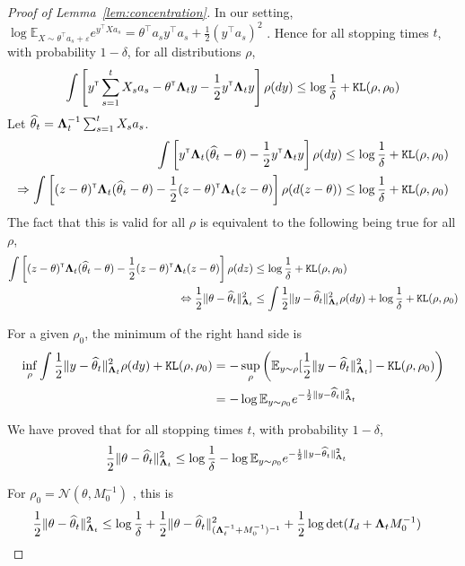 \begin{proof}[Proof of Lemma~\ref{lem:concentration}]
In our setting, $\log \mathbb{E}_{X\sim \theta^\top a_s+\varepsilon}e^{y^\top X a_s} = \theta^\top a_s y^\top a_s+\frac{1}{2} (y^\top a_s)^2$ . Hence for all stopping times $t$, with probability $1- \delta$, for all distributions $\rho$,
\begin{align*}
\int \left[y^{\mathsf{\scriptscriptstyle T}} \sum_{s=1}^t X_s a_s - \theta^{\mathsf{\scriptscriptstyle T}} {\boldsymbol \Lambda}_t y -\frac{1}{2} y^{\mathsf{\scriptscriptstyle T}} {\boldsymbol \Lambda}_t y \right] \rho(dy)
\le \log\frac{1}{\delta} + \texttt{KL}(\rho,\rho_0)
\end{align*}
Let $\widehat{\theta}_t = {\boldsymbol \Lambda}_t^{-1}\sum_{s=1}^t X_s a_s$.
\begin{align*}
\int \left[y^{\mathsf{\scriptscriptstyle T}} {\boldsymbol \Lambda}_t (\widehat{\theta}_t - \theta) - \frac{1}{2} y^{\mathsf{\scriptscriptstyle T}} {\boldsymbol \Lambda}_t y \right] \rho(dy)
&\le \log\frac{1}{\delta} + \texttt{KL}(\rho,\rho_0)
\\
\Rightarrow \int \left[(z - \theta)^{\mathsf{\scriptscriptstyle T}} {\boldsymbol \Lambda}_t (\widehat{\theta}_t - \theta) - \frac{1}{2} (z - \theta)^{\mathsf{\scriptscriptstyle T}} {\boldsymbol \Lambda}_t (z - \theta) \right] \rho(d(z - \theta))
&\le \log\frac{1}{\delta} + \texttt{KL}(\rho,\rho_0)
\end{align*}
The fact that this is valid for all $\rho$ is equivalent to the following being true for all $\rho$,
\begin{align*}
\int \left[(z - \theta)^{\mathsf{\scriptscriptstyle T}} {\boldsymbol \Lambda}_t (\widehat{\theta}_t - \theta) - \frac{1}{2} (z - \theta)^{\mathsf{\scriptscriptstyle T}} {\boldsymbol \Lambda}_t (z - \theta) \right] \rho(dz)
&\le \log\frac{1}{\delta} + \texttt{KL}(\rho,\rho_0)
\\
\Leftrightarrow
\frac{1}{2} \Vert \theta - \widehat{\theta}_t \Vert^2_{{\boldsymbol \Lambda}_t}
&\le \int  \frac{1}{2} \Vert y - \widehat{\theta}_t \Vert_{{\boldsymbol \Lambda}_t}^2  \rho(dy)  + \log\frac{1}{\delta} + \texttt{KL}(\rho,\rho_0)
\end{align*}

For a given $\rho_0$, the minimum of the right hand side is
\begin{align*}
\inf_\rho \int \frac{1}{2} \Vert y - \widehat{\theta}_t \Vert_{{\boldsymbol \Lambda}_t}^2  \rho(dy) + \texttt{KL}(\rho,\rho_0)
&= - \sup_\rho \left(\mathbb{E}_{y\sim\rho}[\frac{1}{2} \Vert y - \widehat{\theta}_t \Vert_{{\boldsymbol \Lambda}_t}^2] - \texttt{KL}(\rho, \rho_0)\right)
\\
&= - \log \mathbb{E}_{y \sim \rho_0} e^{- \frac{1}{2} \Vert y - \widehat{\theta}_t \Vert_{{\boldsymbol \Lambda}_t}^2}
\end{align*}

We have proved that for all stopping times $t$, with probability $1- \delta$,
\begin{align*}
\frac{1}{2} \Vert \theta - \widehat{\theta}_t \Vert^2_{{\boldsymbol \Lambda}_t}
&\le \log\frac{1}{\delta} - \log \mathbb{E}_{y \sim \rho_0} e^{- \frac{1}{2} \Vert y - \widehat{\theta}_t \Vert_{{\boldsymbol \Lambda}_t}^2}
\end{align*}

For $\rho_0 = \mathcal N(\theta, M_0^{-1})$ , this is
\begin{align*}
\frac{1}{2} \Vert \theta - \widehat{\theta}_t \Vert^2_{{\boldsymbol \Lambda}_t}
&\le \log\frac{1}{\delta} + \frac{1}{2} \Vert \theta - \widehat{\theta}_t \Vert_{({\boldsymbol \Lambda}_t^{-1} + M_0^{-1})^{-1}}^2 + \frac{1}{2} \log \det (I_d + {\boldsymbol \Lambda}_t M_0^{-1})
\end{align*}

\end{proof}

